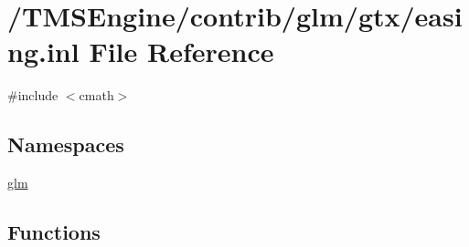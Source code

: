 \hypertarget{easing_8inl}{}\section{/\+T\+M\+S\+Engine/contrib/glm/gtx/easing.inl File Reference}
\label{easing_8inl}
{\ttfamily \#include $<$cmath$>$}\newline
\subsection*{Namespaces}
\begin{DoxyCompactItemize}
\item 
 \hyperlink{namespaceglm}{glm}
\end{DoxyCompactItemize}
\subsection*{Functions}
